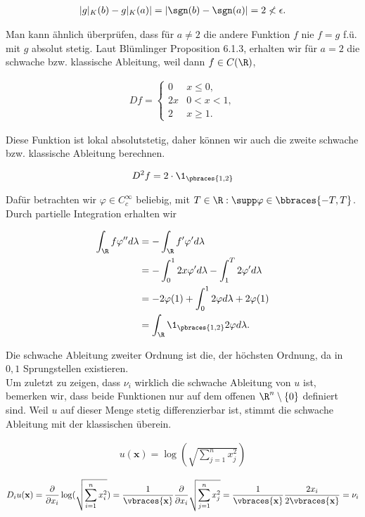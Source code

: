 \begin{solution}
\begin{align*}
  |g|_K(b) - g|_K(a)| = |\sgn(b) - \sgn(a)| = 2 \nless \epsilon.
\end{align*}

Man kann ähnlich überprüfen, dass für $a \neq 2$ die andere Funktion $f$ nie $f = g$ f.ü. mit $g$ absolut stetig. Laut Blümlinger Proposition 6.1.3, erhalten wir für $a = 2$ die schwache bzw. klassische Ableitung, weil dann $f \in C(\R)$,

\begin{align*}
  Df =
  \begin{cases}
    0  & x \leq 0,  \\
    2x & 0 < x < 1, \\
    2  & x \geq 1.
  \end{cases}
\end{align*}

Diese Funktion ist lokal absolutstetig, daher können wir auch die zweite schwache bzw. klassische Ableitung berechnen.

\begin{align*}
  D^2 f = 2 \cdot \1_{\pbraces{1, 2}}
\end{align*}

Dafür betrachten wir $\varphi \in C^{\infty}_c$ beliebig, mit $T \in \R: \supp \varphi \in \bbraces{-T, T}$. Durch partielle
Integration erhalten wir

\begin{align*}
    \int_\R f \varphi^{\prime \prime} d \lambda
    & = - \int_\R f^\prime \varphi^\prime d \lambda \\
    & = - \int_0^1 2x \varphi^\prime d \lambda
        - \int_1^T 2 \varphi^\prime d \lambda \\
    & = - 2 \varphi(1)
        + \int_0^1 2 \varphi d \lambda
        + 2 \varphi(1) \\
    & = \int_\R \1_{\pbraces{1, 2}} 2 \varphi d \lambda.
\end{align*}

Die schwache Ableitung zweiter Ordnung ist die, der höchsten Ordnung, da in $0, 1$ Sprungstellen existieren. \\

Um zuletzt zu zeigen, dass $\nu_i$ wirklich die schwache Ableitung von $u$ ist, bemerken wir, dass beide Funktionen nur auf dem offenen $\R^n \setminus \{ 0 \}$ definiert sind. Weil $u$ auf dieser Menge stetig differenzierbar ist, stimmt die schwache Ableitung mit der klassischen überein.

\begin{align*}
    u(\textbf{x}) = \log(\sqrt{\sum_{j=1}^n x_j^2})
\end{align*}

\begin{align*}
    D_i u(\textbf{x})
  = \frac{\partial}{\partial x_i} \log(\sqrt{\sum_{i=1}^n x_i^2})
  = \frac{1}{\vbraces{\textbf{x}}} \frac{\partial}{\partial x_i}
    \sqrt{\sum_{j=1}^n x_j^2}
  = \frac{1}{\vbraces{\textbf{x}}} \frac{2x_i}{2\vbraces{\textbf{x}}}
  = \nu_i
\end{align*}

\end{solution}

